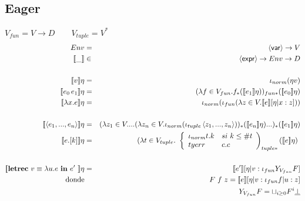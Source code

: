     \subsection{Eager}
      \PN $V_{fun} = V \rightarrow D \qquad V_{tuple} = V^{*}$
      \begin{eqnarray*}
        Env &=& \var \to V \\
        \llbracket\_\rrbracket &\in& \expr \to Env \to D \\ \\
        \llbracket v\rrbracket\eta &=& \iota_{norm}(\eta v) \\
        \llbracket e_0\, e_1\rrbracket\eta &=& (\lambda f \in V_{fun}. f_{*} (\se{e_1}\eta))_{fun*} (\se{e_0}\eta) \\
        \llbracket\lambda x.e\rrbracket\eta &=& \iota_{norm}(\iota_{fun}(\lambda z \in V. \se{e}[\eta|x:z])) \\ \\
        \se{\la e_1, ..., e_n \ra}\eta &=& (\lambda z_1 \in V. ... (\lambda z_n \in V . \iota_{norm}(\iota_{tuple} \la z_1, ..., z_n\ra))_{*} (\se{e_n}\eta) ...)_{*} (\se{e_1}\eta) \\
        \se{e.[k]}\eta &=& (\lambda t \in V_{tuple}. \ \left\lbrace 
        \begin{array}{lll}
          \iota_{norm} t.k & si \ k \leq \# t \\
          tyerr & c.c \\
        \end{array}\right)_{tuple*} (\se{e}\eta) \\ \\
        \se{\letrecin{v \equiv \lambda u.e}{e'}}\eta &=& \se{e'} [\eta |v:\iota_{fun} Y_{V_{fun}} F] \\
        \text{donde} && F\ f\ z = \se{e}[\eta| v: \iota_{fun} f | u:z] \\
        && Y_{V_{fun}} F = \sqcup_{i \geq 0} F^{i} \underline{\bot}
      \end{eqnarray*}